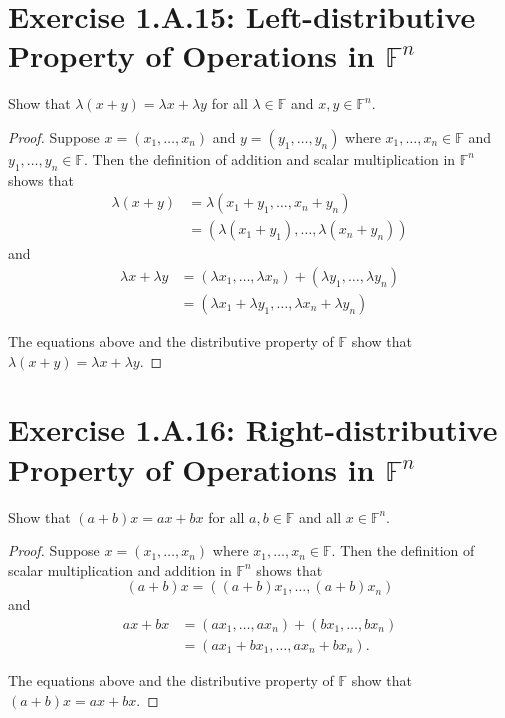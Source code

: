 \section{Exercise 1.A.15: Left-distributive Property of Operations in $\mathbb{F}^n$}
Show that $\lambda(x+y)=\lambda x+\lambda y$ for all $\lambda\in\mathbb{F}$ and $x,y\in\mathbb{F}^n$.
\begin{proof}
Suppose $x=(x_1,\dots,x_n)$ and $y=(y_1,\dots,y_n)$ where $x_1,\dots,x_n\in\mathbb{F}$ and $y_1,\dots,y_n\in\mathbb{F}$. Then the definition of addition and scalar multiplication in $\mathbb{F}^n$ shows that
\begin{equation*}
\begin{split}
\lambda(x+y)&=\lambda(x_1+y_1,\dots,x_n+y_n)\\
&=(\lambda(x_1+y_1),\dots,\lambda(x_n+y_n))
\end{split}
\end{equation*}
and
\begin{equation*}
\begin{split}
\lambda x+\lambda y&=(\lambda x_1,\dots,\lambda x_n) + (\lambda y_1,\dots,\lambda y_n)\\
&=(\lambda x_1+\lambda y_1,\dots,\lambda x_n+\lambda y_n)
\end{split}
\end{equation*}

The equations above and the distributive property of $\mathbb{F}$ show that $\lambda(x+y)=\lambda x+\lambda y$.
\end{proof}

\section{Exercise 1.A.16: Right-distributive Property of Operations in $\mathbb{F}^n$}
Show that $(a+b)x=ax+bx$ for all $a,b\in\mathbb{F}$ and all $x\in\mathbb{F}^n$.
\begin{proof}
Suppose $x=(x_1,\dots,x_n)$ where $x_1,\dots,x_n\in\mathbb{F}$. Then the definition of scalar multiplication and addition in $\mathbb{F}^n$ shows that
\[
(a+b)x=((a+b)x_1,\dots,(a+b)x_n)
\]
and
\begin{equation*}
\begin{split}
ax+bx&=(ax_1,\dots,ax_n)+(bx_1,\dots,bx_n)\\
&=(ax_1+bx_1,\dots,ax_n+bx_n).
\end{split}
\end{equation*}

The equations above and the distributive property of $\mathbb{F}$ show that $(a+b)x=ax+bx$.
\end{proof}

